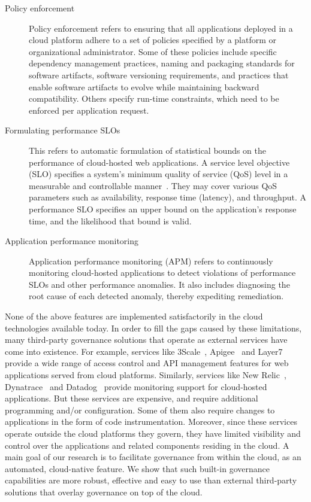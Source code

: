 \begin{description}
\item [Policy enforcement]
Policy enforcement refers to ensuring that all applications deployed in a cloud platform
adhere to a set of policies specified by a platform or organizational administrator.
Some of these policies include specific
dependency management practices, naming and packaging standards for software artifacts, 
software versioning requirements, and practices that enable software artifacts to evolve 
while maintaining backward compatibility.
Others specify run-time constraints, which need to be enforced per application request.

\item [Formulating performance SLOs]
This refers to automatic formulation of statistical bounds on the 
performance of cloud-hosted web applications.
A service level objective (SLO) specifies a system's minimum quality of service (QoS) level in a measurable and
controllable manner~\cite{smj2000}. They may cover various QoS
parameters such as availability, response time (latency), and throughput. A performance SLO
specifies an upper bound on the application's response time, and the likelihood that bound is valid.

\item [Application performance monitoring]
Application performance monitoring (APM) refers to continuously monitoring cloud-hosted applications
to detect violations of performance SLOs and other performance anomalies. 
It also includes diagnosing the root cause of each detected anomaly, thereby expediting
remediation.
\end{description}

None of the above features are implemented satisfactorily in the
cloud technologies available today.
In order to fill the gaps caused by these limitations, many third-party governance solutions that operate as external services
have come into existence. For example, services like 3Scale~\cite{3scale}, Apigee~\cite{apigee} and Layer7~\cite{layer7} provide a wide range
of access control and API management features for web applications served from cloud platforms. Similarly, 
services like New Relic~\cite{newrelic}, Dynatrace~\cite{dynatrace} and Datadog~\cite{datadog} provide monitoring support for cloud-hosted 
applications. But these services are expensive, and require additional programming and/or configuration.
Some of them also require changes to applications in the form of code instrumentation. Moreover,
since these services operate outside the cloud platforms they govern, they have limited visibility and control
over the applications and related components residing in the cloud. A main goal of our research is to facilitate governance
from within the cloud, as an automated, cloud-native feature. We show that such built-in governance capabilities are
more robust, effective and easy to use than external third-party solutions that overlay governance on top of the
cloud.

